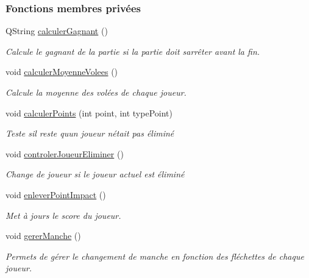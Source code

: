 \subsubsection*{Fonctions membres privées}
\begin{DoxyCompactItemize}
\item 
Q\+String \hyperlink{class_darts_a4d7196c95f584cdce4a33d52f934121f}{calculer\+Gagnant} ()
\begin{DoxyCompactList}\small\item\em Calcule le gagnant de la partie si la partie doit s\textquotesingle{}arrêter avant la fin. \end{DoxyCompactList}\item 
void \hyperlink{class_darts_af87b6a1cd30838b99379aa4061fc43cc}{calculer\+Moyenne\+Volees} ()
\begin{DoxyCompactList}\small\item\em Calcule la moyenne des volées de chaque joueur. \end{DoxyCompactList}\item 
void \hyperlink{class_darts_a6a6c58dee559e851709d76fef9a8c6da}{calculer\+Points} (int point, int type\+Point)
\begin{DoxyCompactList}\small\item\em Teste s\textquotesingle{}il reste qu\textquotesingle{}un joueur n\textquotesingle{}était pas éliminé \end{DoxyCompactList}\item 
void \hyperlink{class_darts_a4ddf889c9c3933e061b182aeb5680c20}{controler\+Joueur\+Eliminer} ()
\begin{DoxyCompactList}\small\item\em Change de joueur si le joueur actuel est éliminé \end{DoxyCompactList}\item 
void \hyperlink{class_darts_ac96311be89ac838f4a37b91bd5655171}{enlever\+Point\+Impact} ()
\begin{DoxyCompactList}\small\item\em Met à jours le score du joueur. \end{DoxyCompactList}\item 
void \hyperlink{class_darts_a76db114bd2191b410bab26cfe5cb76fb}{gerer\+Manche} ()
\begin{DoxyCompactList}\small\item\em Permets de gérer le changement de manche en fonction des fléchettes de chaque joueur. \end{DoxyCompactList}\item 

\end{DoxyCompactItemize}
